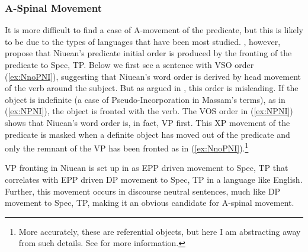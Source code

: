 \documentclass[output=paper,colorlinks,citecolor=brown,
]{langscibook}
\begin{document}

\subsubsection{A-Spinal Movement}

It is more difficult to find a case of A-movement of the predicate, but this is likely to be due to the types of languages that have been most studied.  \citet{Massam:1997}, however, propose that Niuean's predicate initial order is produced by the fronting of the predicate to Spec, TP.  Below we first see a sentence with VSO order (\ref{ex:NnoPNI}), suggesting that Niuean's word order is derived by head movement of the verb around the subject.  But as argued in \citet{Massam:2001}, this order is misleading. If the object is indefinite (a case of Pseudo-Incorporation in Massam's terms), as in (\ref{ex:NPNI}), the object is fronted with the verb. The VOS order in (\ref{ex:NPNI}) shows that Niuean's word order is, in fact, VP first.  This XP movement of the predicate is masked when a definite object has moved out of the predicate and only the remnant of the VP has been fronted as in (\ref{ex:NnoPNI}).\footnote{More accurately, these are referential objects, but here I am abstracting away from such details.  See \citet{Massam:2020} for more information.}


	\z
\z

VP fronting in Niuean is set up in \citet{Massam:1997} as EPP driven movement to Spec, TP that correlates with EPP driven DP movement to Spec, TP in a language like English.  Further, this movement occurs in discourse neutral sentences, much like DP movement to Spec, TP, making it an obvious candidate for A-spinal movement. 
\end{document}
